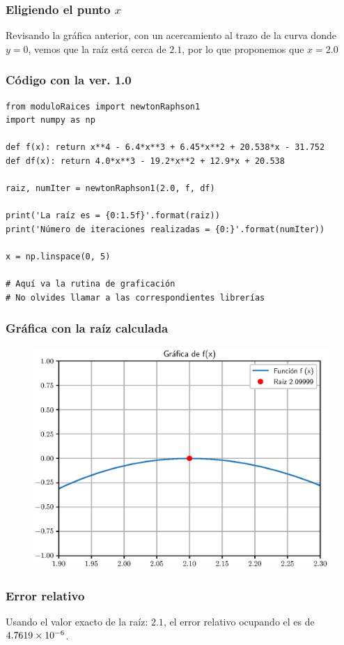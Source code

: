 \documentclass[12pt]{beamer}
\begin{document}
\begin{frame}
\frametitle{Eligiendo el punto $x$}
Revisando la gráfica anterior, con un acercamiento al trazo de la curva donde $y = 0$, \pause vemos que la raíz está cerca de $2.1$, \pause por lo que proponemos que $x = 2.0$
\end{frame}
\begin{frame}
\frametitle{Código con la ver. 1.0}
\begin{lstlisting}[caption=Código para resolver el ejercicio 1]
from moduloRaices import newtonRaphson1
import numpy as np

def f(x): return x**4 - 6.4*x**3 + 6.45*x**2 + 20.538*x - 31.752
def df(x): return 4.0*x**3 - 19.2*x**2 + 12.9*x + 20.538

raiz, numIter = newtonRaphson1(2.0, f, df)

print('La raíz es = {0:1.5f}'.format(raiz))
print('Número de iteraciones realizadas = {0:}'.format(numIter))

x = np.linspace(0, 5)

# Aquí va la rutina de graficación
# No olvides llamar a las correspondientes librerías
\end{lstlisting}
\end{frame}
\begin{frame}
\frametitle{Gráfica con la raíz calculada}
\begin{figure}
    \centering
    \includegraphics[scale=0.55]{Imagenes/raices_03_MNR_02.eps}
\end{figure}
\end{frame}
\begin{frame}
\frametitle{Error relativo}
Usando el valor exacto de la raíz: $2.1$, el error relativo ocupando el  es de $\num{4.7619d-6}$.
\end{frame}
\end{document}
